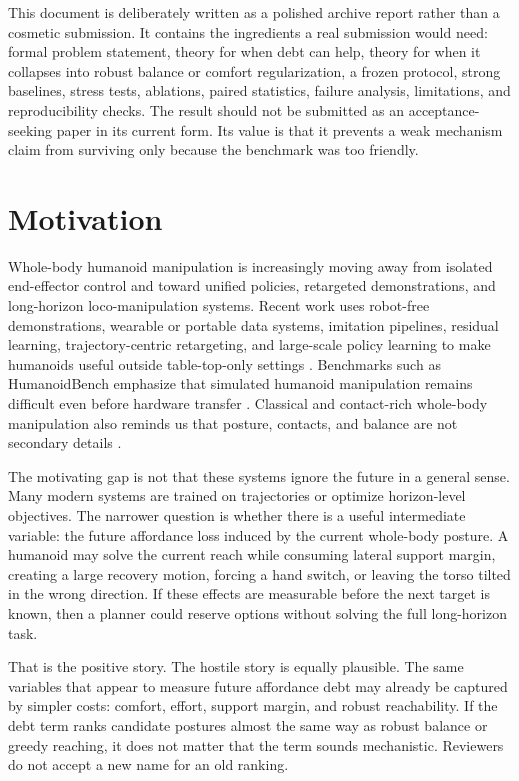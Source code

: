\documentclass{article}
\begin{document}
This document is deliberately written as a polished archive report rather than a cosmetic submission. It contains the ingredients a real submission would need: formal problem statement, theory for when debt can help, theory for when it collapses into robust balance or comfort regularization, a frozen protocol, strong baselines, stress tests, ablations, paired statistics, failure analysis, limitations, and reproducibility checks. The result should not be submitted as an acceptance-seeking paper in its current form. Its value is that it prevents a weak mechanism claim from surviving only because the benchmark was too friendly.



\section{Motivation}

Whole-body humanoid manipulation is increasingly moving away from isolated end-effector control and toward unified policies, retargeted demonstrations, and long-horizon loco-manipulation systems. Recent work uses robot-free demonstrations, wearable or portable data systems, imitation pipelines, residual learning, trajectory-centric retargeting, and large-scale policy learning to make humanoids useful outside table-top-only settings \citep{prior1,prior3,prior4,prior5,prior7,prior8,prior9,prior10,prior11,prior12}. Benchmarks such as HumanoidBench emphasize that simulated humanoid manipulation remains difficult even before hardware transfer \citep{prior14}. Classical and contact-rich whole-body manipulation also reminds us that posture, contacts, and balance are not secondary details \citep{prior2,prior13,prior15,prior16}.

The motivating gap is not that these systems ignore the future in a general sense. Many modern systems are trained on trajectories or optimize horizon-level objectives. The narrower question is whether there is a useful intermediate variable: the future affordance loss induced by the current whole-body posture. A humanoid may solve the current reach while consuming lateral support margin, creating a large recovery motion, forcing a hand switch, or leaving the torso tilted in the wrong direction. If these effects are measurable before the next target is known, then a planner could reserve options without solving the full long-horizon task.

That is the positive story. The hostile story is equally plausible. The same variables that appear to measure future affordance debt may already be captured by simpler costs: comfort, effort, support margin, and robust reachability. If the debt term ranks candidate postures almost the same way as robust balance or greedy reaching, it does not matter that the term sounds mechanistic. Reviewers do not accept a new name for an old ranking.
\end{document}
